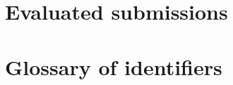 \section{Evaluated submissions}\label{app:history}

\begin{table}[H]
\centering\footnotesize
\caption{All evaluated submissions in chronological order, with their validation scores. The two final submissions
are in bold. Generated from .}\label{tab:history}
\setlength{\tabcolsep}{4.5pt}

\end{table}

\clearpage
\section{Glossary of identifiers}\label{app:glossary}

